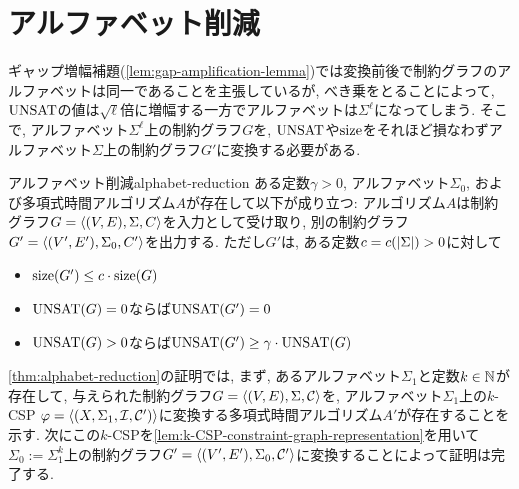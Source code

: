 \section{アルファベット削減}
ギャップ増幅補題(\cref{lem:gap-amplification-lemma})では変換前後で制約グラフのアルファベットは同一であることを主張しているが,
べき乗をとることによって, $\mathrm{UNSAT}$の値は$\sqrt{\ell}$倍に増幅する一方でアルファベットは$\Sigma^\ell$になってしまう.
そこで, アルファベット$\Sigma^\ell$上の制約グラフ$G$を, $\mathrm{UNSAT}$や$\mathrm{size}$をそれほど損なわずアルファベット$\Sigma$上の制約グラフ$G'$に変換する必要がある.
\begin{theorem}{アルファベット削減}{alphabet-reduction}
  ある定数$\gamma>0$, アルファベット$\Sigma_0$, および多項式時間アルゴリズム$A$が存在して以下が成り立つ:
  アルゴリズム$A$は制約グラフ$G=\langle(V,E),\Sigma,C\rangle$を入力として受け取り,
  別の制約グラフ$G'=\langle(V',E'),\Sigma_0,C'\rangle$を出力する.
  ただし$G'$は, ある定数$c=c(\abs{\Sigma})>0$に対して
  \begin{itemize}
    \item $\mathrm{size}(G') \le c\cdot \mathrm{size}(G)$
    \item $\mathrm{UNSAT}(G)=0$ならば$\mathrm{UNSAT}(G')=0$
    \item $\mathrm{UNSAT}(G)>0$ならば$\mathrm{UNSAT}(G') \ge \gamma\cdot\mathrm{UNSAT}(G)$
  \end{itemize}
\end{theorem}
\cref{thm:alphabet-reduction}の証明では,
  まず, あるアルファベット$\Sigma_1$と定数$k\in\mathbb{N}$が存在して,
  与えられた制約グラフ$G=\langle(V,E),\Sigma,\mathcal{C}\rangle$を, アルファベット$\Sigma_1$上の$k$-CSP $\varphi=\langle(X,\Sigma_1,\mathcal{I},\mathcal{C}')\rangle$に変換する多項式時間アルゴリズム$A'$が存在することを示す.
  次にこの$k$-CSPを\cref{lem:k-CSP-constraint-graph-representation}を用いて$\Sigma_0:=\Sigma_1^k$上の制約グラフ$G'=\langle(V',E'),\Sigma_0,\mathcal{C}'\rangle$に変換することによって証明は完了する.

